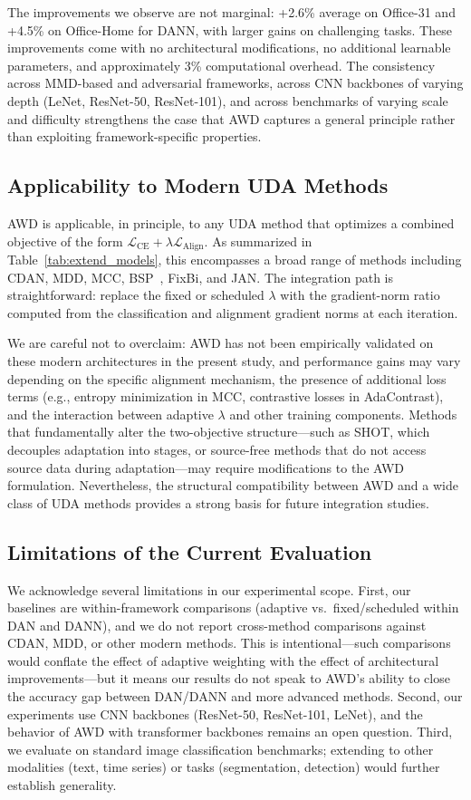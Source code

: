 \documentclass[pdflatex,sn-mathphys-num]{sn-jnl}
\theoremstyle{thmstyleone}
\theoremstyle{thmstyletwo}
\theoremstyle{thmstylethree}
\begin{document}
The improvements we observe are not marginal: +2.6\% average on Office-31 and +4.5\% on Office-Home for DANN, with larger gains on challenging tasks. These improvements come with no architectural modifications, no additional learnable parameters, and approximately 3\% computational overhead. The consistency across MMD-based and adversarial frameworks, across CNN backbones of varying depth (LeNet, ResNet-50, ResNet-101), and across benchmarks of varying scale and difficulty strengthens the case that AWD captures a general principle rather than exploiting framework-specific properties.

\subsection{Applicability to Modern UDA Methods}

AWD is applicable, in principle, to any UDA method that optimizes a combined objective of the form $\mathcal{L}_{\text{CE}} + \lambda \mathcal{L}_{\text{Align}}$. As summarized in Table~\ref{tab:extend_models}, this encompasses a broad range of methods including CDAN, MDD, MCC, BSP~\cite{chen2019bsp}, FixBi, and JAN. The integration path is straightforward: replace the fixed or scheduled $\lambda$ with the gradient-norm ratio computed from the classification and alignment gradient norms at each iteration.

We are careful not to overclaim: AWD has not been empirically validated on these modern architectures in the present study, and performance gains may vary depending on the specific alignment mechanism, the presence of additional loss terms (e.g., entropy minimization in MCC, contrastive losses in AdaContrast), and the interaction between adaptive $\lambda$ and other training components. Methods that fundamentally alter the two-objective structure---such as SHOT, which decouples adaptation into stages, or source-free methods that do not access source data during adaptation---may require modifications to the AWD formulation. Nevertheless, the structural compatibility between AWD and a wide class of UDA methods provides a strong basis for future integration studies.

\subsection{Limitations of the Current Evaluation}

We acknowledge several limitations in our experimental scope. First, our baselines are within-framework comparisons (adaptive vs.\ fixed/scheduled within DAN and DANN), and we do not report cross-method comparisons against CDAN, MDD, or other modern methods. This is intentional---such comparisons would conflate the effect of adaptive weighting with the effect of architectural improvements---but it means our results do not speak to AWD's ability to close the accuracy gap between DAN/DANN and more advanced methods. Second, our experiments use CNN backbones (ResNet-50, ResNet-101, LeNet), and the behavior of AWD with transformer backbones remains an open question. Third, we evaluate on standard image classification benchmarks; extending to other modalities (text, time series) or tasks (segmentation, detection) would further establish generality.
\end{document}
